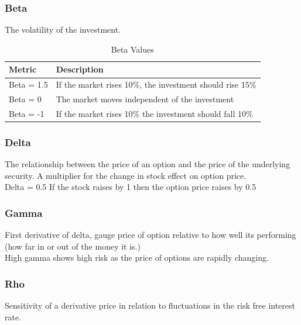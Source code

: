 \documentclass[11pt]{scrartcl} %
\begin{document}
\subsubsection{Beta}

The volatility of the investment.

\begin{table}[h] %
	\centering %
	\begin{tabular}{l l}
		\toprule
		\textbf{Metric} & \textbf{Description} \\
		\midrule
		Beta = 1.5 & If the market rises 10\%, the investment should rise 15\% \\
		Beta = 0 & The market moves independent of the investment \\
		Beta = -1 & If the market rises 10\% the investment should fall 10\%\\ 
		\bottomrule
	\end{tabular}
	\caption{Beta Values}
\end{table}

\subsubsection{Delta}

The relationship between the price of an option and the price of the underlying security. A multiplier for the change in stock effect on option price.\\

Delta = 0.5 If the stock raises by 1 then the option price raises by 0.5 

\subsubsection{Gamma}

First derivative of delta, gauge price of option relative to how well its performing (how far in or out of the money it is.)\\

High gamma shows high risk as the price of options are rapidly changing.

\subsubsection{Rho}

Sensitivity of a derivative price in relation to fluctuations in the risk free interest rate.\\
\end{document}
